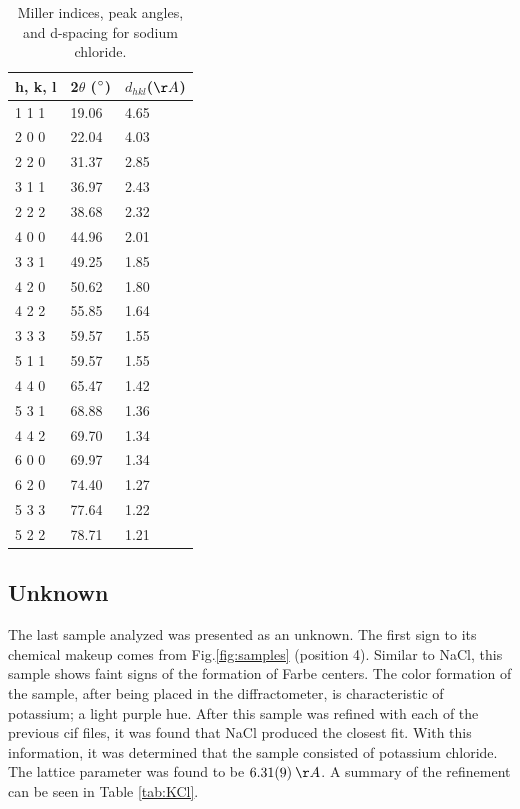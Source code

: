 \documentclass[12pt]{article}
\begin{document}
\newpage

\begin{table}[t]\centering
\begin{tabular}{ |p{3cm}|p{3cm}|p{3cm}|}
 \hline
  h, k, l & 2$\theta$ ($\degree$)& $d_{hkl}$($\AA$)\\
 \hline
 1 1 1 &  19.06 & 4.65\\
 \hline
 2 0 0 &  22.04 & 4.03\\
 \hline
 2 2 0 &  31.37 & 2.85\\
 \hline
 3 1 1 &  36.97 & 2.43\\
 \hline
 2 2 2 &  38.68 & 2.32\\
 \hline
 4 0 0 &  44.96 & 2.01\\
 \hline
 3 3 1 &  49.25 & 1.85\\
 \hline
 4 2 0 &  50.62 & 1.80\\
 \hline
 4 2 2 &  55.85 & 1.64\\
 \hline
 3 3 3 &  59.57 & 1.55\\
 \hline
 5 1 1 &  59.57 & 1.55\\
 \hline
 4 4 0 &  65.47 & 1.42\\
 \hline
 5 3 1 &  68.88 & 1.36\\
 \hline
 4 4 2 &  69.70 & 1.34\\
 \hline
 6 0 0 &  69.97 & 1.34\\
 \hline
 6 2 0 &  74.40 & 1.27\\
 \hline
 5 3 3 &  77.64 & 1.22\\
 \hline
 5 2 2 &  78.71 & 1.21\\
 \hline
\end{tabular}
\def\sym#1{\ifmmode^{#1}\else\(^{#1}\)\fi}
\caption{Miller indices, peak angles, and d-spacing for sodium chloride.}\label{tab:NaCl_miller}
\end{table}

\subsection{Unknown}
The last sample analyzed was presented as an unknown. The first sign to its chemical makeup comes from Fig.\ref{fig:samples} (position 4). Similar to NaCl, this sample shows faint signs of the formation of Farbe centers. The color formation of the sample, after being placed in the diffractometer, is characteristic of potassium; a light purple hue.  After this sample was refined with each of the previous cif files, it was found that NaCl produced the closest fit. With this information, it was determined that the sample consisted of potassium chloride. The lattice parameter was found to be $6.31(9)\:\AA$. A summary of the refinement can be seen in Table \ref{tab:KCl}. \\\\
\end{document}
